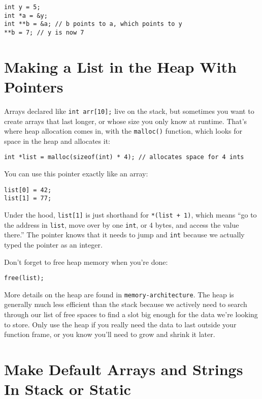 \documentclass[12pt]{article}
\begin{document}
\begin{verbatim}
int y = 5;
int *a = &y;
int **b = &a; // b points to a, which points to y
**b = 7; // y is now 7
\end{verbatim}

\section*{Making a List in the Heap With Pointers}

Arrays declared like \texttt{int arr[10];} live on the stack, but sometimes you want to create arrays that last longer, or whose size you only know at runtime. That’s where heap allocation comes in, with the \texttt{malloc()} function, which looks for space in the heap and allocates it:

\begin{verbatim}
int *list = malloc(sizeof(int) * 4); // allocates space for 4 ints
\end{verbatim}

You can use this pointer exactly like an array:

\begin{verbatim}
list[0] = 42;
list[1] = 77;
\end{verbatim}

Under the hood, \texttt{list[1]} is just shorthand for \texttt{*(list + 1)}, which means “go to the address in \texttt{list}, move over by one \texttt{int}, or 4 bytes, and access the value there.” The pointer knows that it needs to jump and \texttt{int} because we actually typed the pointer as an integer.

Don’t forget to free heap memory when you’re done:

\begin{verbatim}
free(list);
\end{verbatim}

More details on the heap are found in \texttt{memory-architecture}. The heap is generally much less efficient than the stack because we actively need to search through our list of free spaces to find a slot big enough for the data we're looking to store. Only use the heap if you really need the data to last outside your function frame, or you know you'll need to grow and shrink it later. 

\section*{Make Default Arrays and Strings In Stack or Static}
\end{document}
